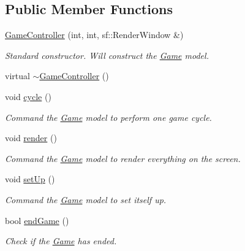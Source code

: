\subsection*{\-Public \-Member \-Functions}
\begin{DoxyCompactItemize}
\item 
\hyperlink{classgame_1_1GameController_abce6b33ccdc1dff31ccff55c7efe2572}{\-Game\-Controller} (int, int, sf\-::\-Render\-Window \&)
\begin{DoxyCompactList}\small\item\em \-Standard constructor. \-Will construct the \hyperlink{classgame_1_1Game}{\-Game} model. \end{DoxyCompactList}\item 
virtual \hyperlink{classgame_1_1GameController_a3c6f679a1d320ea6487cd58352bb8343}{$\sim$\-Game\-Controller} ()
\item 
void \hyperlink{classgame_1_1GameController_aac7f448b867cb9f9ec3704040630d714}{cycle} ()
\begin{DoxyCompactList}\small\item\em \-Command the \hyperlink{classgame_1_1Game}{\-Game} model to perform one game cycle. \end{DoxyCompactList}\item 
void \hyperlink{classgame_1_1GameController_ac84067d08492936a5bbf2c3d0b114717}{render} ()
\begin{DoxyCompactList}\small\item\em \-Command the \hyperlink{classgame_1_1Game}{\-Game} model to render everything on the screen. \end{DoxyCompactList}\item 
void \hyperlink{classgame_1_1GameController_a2f1955c3f1fdffa39b3681f23b994e7c}{set\-Up} ()
\begin{DoxyCompactList}\small\item\em \-Command the \hyperlink{classgame_1_1Game}{\-Game} model to set itself up. \end{DoxyCompactList}\item 
bool \hyperlink{classgame_1_1GameController_a9164fe693057a279f7c3c45c76e6b835}{end\-Game} ()
\begin{DoxyCompactList}\small\item\em \-Check if the \hyperlink{classgame_1_1Game}{\-Game} has ended. \end{DoxyCompactList}\end{DoxyCompactItemize}
